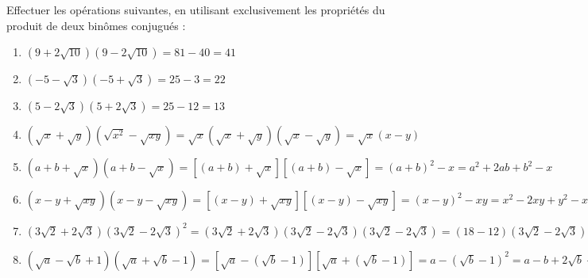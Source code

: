 \begin{solution}
Effectuer les opérations suivantes, en utilisant exclusivement les propriétés du produit de deux binômes conjugués :
\begin{enumerate}
\item $\left( 9+2\sqrt{10} \right)\left( 9-2\sqrt{10} \right)=81-40=41$
\item $\left( -5-\sqrt{3} \right)\left( -5+\sqrt{3} \right)=25-3=22$
\item $\left( 5-2\sqrt{3} \right)\left( 5+2\sqrt{3} \right)=25-12=13$
\item $\left( \sqrt{x}+\sqrt{y} \right)\left( \sqrt{{{x}^{2}}}-\sqrt{xy} \right)=\sqrt{x}\left( \sqrt{x}+\sqrt{y} \right)\left( \sqrt{x}-\sqrt{y} \right)=\sqrt{x}\left( x-y \right)$
\item $\left( a+b+\sqrt{x} \right)\left( a+b-\sqrt{x} \right)=\left[ \left( a+b \right)+\sqrt{x} \right]\left[ \left( a+b \right)-\sqrt{x} \right]={{\left( a+b \right)}^{2}}-x={{a}^{2}}+2ab+{{b}^{2}}-x$
\item $\left( x-y+\sqrt{xy} \right)\left( x-y-\sqrt{xy} \right)=\left[ \left( x-y \right)+\sqrt{xy} \right]\left[ \left( x-y \right)-\sqrt{xy} \right]={{\left( x-y \right)}^{2}}-xy={{x}^{2}}-2xy+{{y}^{2}}-xy={{x}^{2}}-3xy+{{y}^{2}}$
\item $\left( 3\sqrt{2}+2\sqrt{3} \right){{\left( 3\sqrt{2}-2\sqrt{3} \right)}^{2}}=\left( 3\sqrt{2}+2\sqrt{3} \right)\left( 3\sqrt{2}-2\sqrt{3} \right)\left( 3\sqrt{2}-2\sqrt{3} \right)=(18-12)\left( 3\sqrt{2}-2\sqrt{3} \right)=18\sqrt{2}-12\sqrt{3}$
\item $\left( \sqrt{a}-\sqrt{b}+1 \right)\left( \sqrt{a}+\sqrt{b}-1 \right)=\left[ \sqrt{a}-\left( \sqrt{b}-1 \right) \right]\left[ \sqrt{a}+\left( \sqrt{b}-1 \right) \right]=a-{{\left( \sqrt{b}-1 \right)}^{2}}=a-b+2\sqrt{b}-1$
\end{enumerate}
\end{solution}

